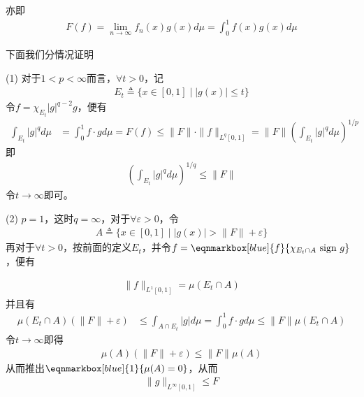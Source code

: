 \begin{enumerate}[leftmargin=2cm, label=\arabic*]
\begin{enumerate}[leftmargin=1cm, label=(\arabic*)]
        \vspace{3em}
        亦即
        \begin{align*}
            F(f) = \lim\limits_{n\to\infty} f_n(x)g(x)d\mu = \int_0^1 f(x)g(x) d\mu
        \end{align*}
        
        下面我们分情况证明

        (1) 对于$1<p<\infty$而言，$\forall t>0$，记
        \begin{align*}
            E_t \triangleq \{x\in[0,1]\mid |g(x)| \leqslant t\}
        \end{align*}
        令$f = \chi_{E_t}|g|^{q-2}g$，便有
        \begin{align*}
            \int_{E_t}|g|^q d\mu &= \int_0^1 f\cdot gd\mu = F(f) \leqslant \|F\|\cdot \|f\|_{L^q[0,1]} = \|F\|(\int_{E_t} |g|^q d\mu)^{1/p}
        \end{align*}
        即
        \begin{align*}
            (\int_{E_t}|g|^q d\mu)^{1/q} \leqslant \|F\|
        \end{align*}
        令$t\to\infty$即可。

        (2) $p =1$，这时$q=\infty$，对于$\forall \varepsilon > 0$，令
        \begin{align*}
            A\triangleq \{x\in[0,1]\mid |g(x)| >\|F\| + \varepsilon\}
        \end{align*}
        再对于$\forall t>0$，按前面的定义$E_t$，并令$f = \eqnmarkbox[blue]{f}{\chi_{E_t\cap A}\ \text{sign}\ g}$，便有
        
        \begin{align*}
            \|f\|_{L^1[0,1]} = \mu(E_t\cap A)
        \end{align*}
        并且有
        \begin{align*}
            \mu(E_t\cap A)(\|F\|+\varepsilon) &\leqslant \int_{A\cap E_t} |g| d\mu = \int_0^1 f\cdot gd\mu \leqslant \|F\| \mu(E_t\cap A)
        \end{align*}
        令$t\to\infty$即得
        \begin{align*}
            \mu(A)(\|F\| + \varepsilon) \leqslant \|F\| \mu(A)
        \end{align*}
        从而推出$\eqnmarkbox[blue]{1}{\mu(A)=0}$，从而
        \begin{align*}
            \|g\|_{L^{\infty}[0,1]} \leqslant F
        \end{align*}


\end{enumerate}
\end{enumerate}
